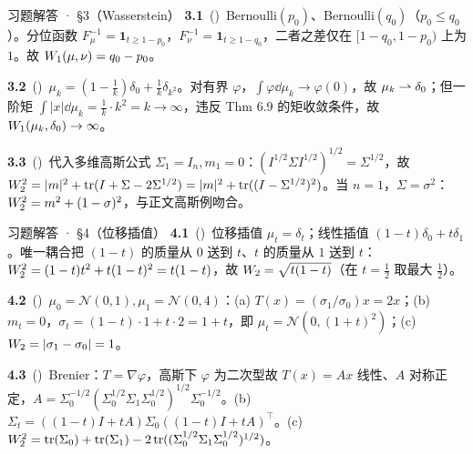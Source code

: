 \begin{frame}{习题解答 · §3（Wasserstein）}
  \textbf{3.1}~(\diffI)\ Bernoulli$(p_0)$、Bernoulli$(q_0)$（$p_0\le q_0$）。分位函数 $F_\mu^{-1}=\mathbf{1}_{t\ge1-p_0}$，$F_\nu^{-1}=\mathbf{1}_{t\ge1-q_0}$，二者之差仅在 $[1-q_0,1-p_0)$ 上为 $1$。故 $W_{1}(\mu,\nu)=q_0-p_0$。

  \medskip
  \textbf{3.2}~(\diffII)\ $\mu_k=(1-\tfrac1k)\delta_0+\tfrac1k\delta_{k^2}$。对有界 $\varphi$，$\int\varphi\dd\mu_k\to\varphi(0)$，故 $\mu_k\rightharpoonup\delta_0$；但一阶矩 $\int|x|\dd\mu_k=\tfrac1k\cdot k^2=k\to\infty$，违反 Thm 6.9 的矩收敛条件，故 $W_{1}(\mu_k,\delta_0)\to\infty$。

  \medskip
  \textbf{3.3}~(\diffIII)\ 代入多维高斯公式 $\Sigma_1=I_n,m_1=0$：$(I^{1/2}\Sigma I^{1/2})^{1/2}=\Sigma^{1/2}$，故 $W_{2}^2=|m|^2+\mathrm{tr}(I+\Sigma-2\Sigma^{1/2})=|m|^2+\mathrm{tr}((I-\Sigma^{1/2})^2)$。当 $n=1$，$\Sigma=\sigma^2$：$W_{2}^2=m^2+(1-\sigma)^2$，与正文高斯例吻合。

\end{frame}

\begin{frame}{习题解答 · §4（位移插值）}
  \textbf{4.1}~(\diffI)\ 位移插值 $\mu_t=\delta_t$；线性插值 $(1-t)\delta_0+t\delta_1$。唯一耦合把 $(1-t)$ 的质量从 $0$ 送到 $t$、$t$ 的质量从 $1$ 送到 $t$：$W_{2}^2=(1-t)t^2+t(1-t)^2=t(1-t)$，故 $W_{2}=\sqrt{t(1-t)}$（在 $t=\tfrac12$ 取最大 $\tfrac12$）。

  \medskip
  \textbf{4.2}~(\diffII)\ $\mu_0=\mathcal{N}(0,1),\mu_1=\mathcal{N}(0,4)$：(a) $T(x)=(\sigma_1/\sigma_0)x=2x$；(b) $m_t=0$，$\sigma_t=(1-t)\cdot1+t\cdot2=1+t$，即 $\mu_t=\mathcal{N}(0,(1+t)^2)$；(c) $W_{2}=|\sigma_1-\sigma_0|=1$。

  \medskip
  \textbf{4.3}~(\diffIII)\ Brenier：$T=\nabla\varphi$，高斯下 $\varphi$ 为二次型故 $T(x)=Ax$ 线性、$A$ 对称正定，$A=\Sigma_0^{-1/2}(\Sigma_0^{1/2}\Sigma_1\Sigma_0^{1/2})^{1/2}\Sigma_0^{-1/2}$。(b) $\Sigma_t=((1-t)I+tA)\Sigma_0((1-t)I+tA)^{\top}$。(c) $W_{2}^2=\mathrm{tr}(\Sigma_0)+\mathrm{tr}(\Sigma_1)-2\,\mathrm{tr}((\Sigma_0^{1/2}\Sigma_1\Sigma_0^{1/2})^{1/2})$。

\end{frame}

